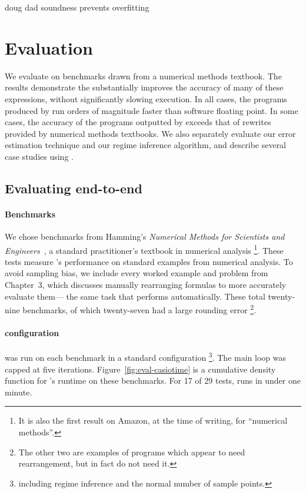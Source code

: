 \documentclass[paper.tex]{subfiles}
\begin{document}
doug dad soundness prevents overfitting

\section{Evaluation}
\label{sec:evaluation}


We evaluate \casio on benchmarks drawn from a numerical methods
textbook.  The results demonstrate the \casio substantially improves
the accuracy of many of these expressions, without significantly
slowing execution.  In all cases, the programs produced by \casio run
orders of magnitude faster than software floating point.  In some
cases, the accuracy of the programs outputted by \casio exceeds that
of rewrites provided by numerical methods textbooks.  We also
separately evaluate our error estimation technique and our regime
inference algorithm, and describe several case studies using \casio.

\subsection{Evaluating \casio end-to-end}

\paragraph{Benchmarks}
We chose benchmarks from Hamming's \emph{Numerical Methods for
  Scientists and Engineers}~\cite{book87-nmse}, a standard
practitioner's textbook in numerical analysis%
\footnote{It is also the first result on Amazon, at the time of
  writing, for ``numerical methods''.}.  These tests measure \casio's
performance on standard examples from numerical analysis.  To avoid
sampling bias, we include every worked example and problem from
Chapter~3, which discusses manually rearranging formulas to more
accurately evaluate them---%
the same task that \casio performs automatically.  These total
twenty-nine benchmarks, of which twenty-seven had a large rounding
error%
\footnote{The other two are examples of programs which appear to need
  rearrangement, but in fact do not need it.}.

\paragraph{\casio configuration}
\casio was run on each benchmark in a standard configuration%
  \footnote{including regime inference and
    the normal number of sample points.}.
The main loop was capped at five iterations.
Figure~\ref{fig:eval-casiotime} is a cumulative density function
  for \casio's runtime on these benchmarks.
For 17 of 29 tests, \casio runs in under one minute.
\end{document}
